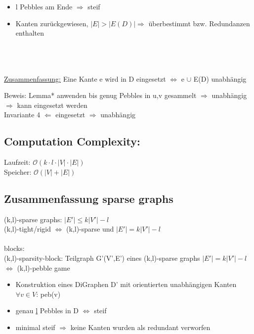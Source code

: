 \documentclass[12pt,a4paper]{article}
\begin{document}
\begin{itemize}
	\item l Pebbles am Ende $\Rightarrow$ steif
	\item Kanten zurückgewiesen, $|E|>|E(D)| \Rightarrow$ überbestimmt bzw. Redundanzen enthalten
\end{itemize}

\\\\\\
\underline{Zusammenfassung:}
Eine Kante e wird in D eingesetzt $\Leftrightarrow$ e $\cup$ E(D) unabhängig

Beweis: Lemma* anwenden bis genug Pebbles in u,v gesammelt $\Rightarrow$ unabhängig $\Rightarrow$ kann eingesetzt werden\\
Invariante 4 $\Leftarrow$ eingesetzt $\Rightarrow$ unabhängig


\subsection{Computation Complexity:}
Laufzeit: $\mathcal{O}(k\cdot l\cdot |V|\cdot |E|)$\\
Speicher: $\mathcal{O}(|V| + |E|)$

\subsection{Zusammenfassung sparse graphs}
(k,l)-sparse graphs: $|E'|\leq k|V'|-l$\\
(k,l)-tight/rigid $\Leftrightarrow$ (k,l)-sparse und $|E'|=k|V'|-l$\\\\
blocks:\\
(k,l)-sparsity-block: Teilgraph G'(V',E') eines (k,l)-sparse graphs $|E'|=k|V'|-l$ $\Leftrightarrow$ (k,l)-pebble game\\

\begin{itemize}
	\item Konstruktion eines DiGraphen D' mit orientierten unabhängigen Kanten\\
  $\forall v \in V$: peb(v)
	\item genau \underline{l} Pebbles in D $\Leftrightarrow$ steif
	\item minimal steif $\Rightarrow$ keine Kanten wurden als redundant verworfen
\end{itemize}
\end{document}
